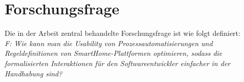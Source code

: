 \section{Forschungsfrage}
\label{sec:forschungsfragen}
    Die in der Arbeit zentral behandelte Forschungsfrage ist wie folgt definiert: 
    \\
    \linebreak 
    \textit{F: Wie kann man die Usability von Prozessautomatisierungen und Regeldefinitionen von SmartHome-Plattformen optimieren, sodass die formalisierten Interaktionen für den Softwareentwickler einfacher in der Handhabung sind?}

